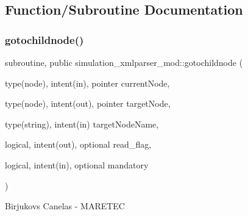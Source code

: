 \subsection{Function/\+Subroutine Documentation}
\mbox{\label{namespacesimulation__xmlparser__mod_a3167fcb99b40cdc25d2ba18418bd8b9f}} 
\subsubsection{\texorpdfstring{gotochildnode()}{gotochildnode()}}
{\footnotesize\ttfamily subroutine, public simulation\+\_\+xmlparser\+\_\+mod\+::gotochildnode (\begin{DoxyParamCaption}\item[{type(node), intent(in), pointer}]{current\+Node,  }\item[{type(node), intent(out), pointer}]{target\+Node,  }\item[{type(string), intent(in)}]{target\+Node\+Name,  }\item[{logical, intent(out), optional}]{read\+\_\+flag,  }\item[{logical, intent(in), optional}]{mandatory }\end{DoxyParamCaption})}



Birjukovs Canelas -\/ M\+A\+R\+E\+T\+EC 

